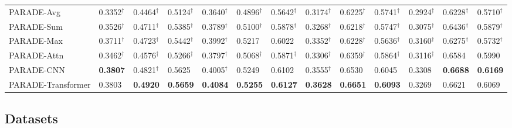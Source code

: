 \begin{table*}[tb]
{\begin{tabular}{l|lll|lll|lll|lll}
\midrule
PARADE-Avg         & 0.3352$^{\dagger}$ & 0.4464$^{\dagger}$ & 0.5124$^{\dagger}$ & 0.3640$^{\dagger}$ & 0.4896$^{\dagger}$ & 0.5642$^{\dagger}$ & 0.3174$^{\dagger}$ & 0.6225$^{\dagger}$ & 0.5741$^{\dagger}$ & 0.2924$^{\dagger}$ & 0.6228$^{\dagger}$ & 0.5710$^{\dagger}$\\
PARADE-Sum         & 0.3526$^{\dagger}$ & 0.4711$^{\dagger}$ & 0.5385$^{\dagger}$ & 0.3789$^{\dagger}$ & 0.5100$^{\dagger}$ & 0.5878$^{\dagger}$ & 0.3268$^{\dagger}$ & 0.6218$^{\dagger}$ & 0.5747$^{\dagger}$ & 0.3075$^{\dagger}$ & 0.6436$^{\dagger}$ & 0.5879$^{\dagger}$ \\
PARADE-Max         & 0.3711$^{\dagger}$ & 0.4723$^{\dagger}$ & 0.5442$^{\dagger}$ & 0.3992$^{\dagger}$ & 0.5217 & 0.6022 & 0.3352$^{\dagger}$ & 0.6228$^{\dagger}$ & 0.5636$^{\dagger}$ & 0.3160$^{\dagger}$ & 0.6275$^{\dagger}$ & 0.5732$^{\dagger}$\\
PARADE-Attn        & 0.3462$^{\dagger}$ & 0.4576$^{\dagger}$ & 0.5266$^{\dagger}$ & 0.3797$^{\dagger}$ & 0.5068$^{\dagger}$ & 0.5871$^{\dagger}$ & 0.3306$^{\dagger}$ & 0.6359$^{\dagger}$ & 0.5864$^{\dagger}$ & 0.3116$^{\dagger}$ & 0.6584 & 0.5990\\
PARADE-CNN         & {\bf 0.3807 } & 0.4821$^{\dagger}$ & 0.5625 & 0.4005$^{\dagger}$ & 0.5249 & 0.6102 & 0.3555$^{\dagger}$ & 0.6530 & 0.6045 & 0.3308 & {\bf 0.6688} & {\bf 0.6169}\\
PARADE-Transformer & 0.3803 & {\bf 0.4920} & {\bf 0.5659} & {\bf 0.4084} & {\bf 0.5255} & {\bf 0.6127} & {\bf 0.3628} & {\bf 0.6651} & {\bf 0.6093} & 0.3269 & 0.6621 & 0.6069 \\ \bottomrule
\end{tabular}}
\label{tb.main_result}
\end{table*}











\subsection{Datasets} \label{sec:PARADE_dataset}

